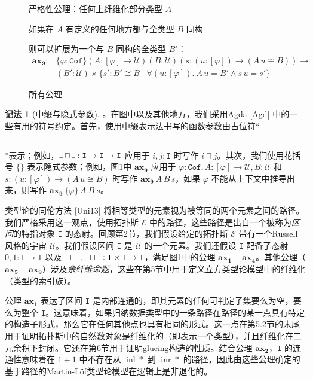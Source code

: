 \documentclass{ctexart}
\theoremstyle{plain}
\theoremstyle{definition}
\theoremstyle{definition}
\theoremstyle{definition}
\theoremstyle{definition}
\newtheorem{notation}[theorem]{记法}
\newcommand\ttI{\mathtt{I}}
\newcommand{\Cof}{\mathtt{Cof}}
\DeclareMathOperator\inl{inl}
\DeclareMathOperator\inr{inr}
\newcommand{\ax}[1]{\mathbf{ax_{#1}}}
\newcommand{\ul}{{\rule[0ex]{0.4em}{0.4pt}}} %
\numberwithin{equation}{section}
\begin{document}
\begin{figure}[htbp]
严格性公理：任何上纤维化部分类型 $A$

如果在 $A$ 有定义的任何地方都与全类型 $B$ 同构

则可以扩展为一个与 $B$ 同构的全类型 $B'$：
\begin{align*}
\ax{9} : &\{\varphi : \Cof\}(A : [\varphi] \to \mathcal{U})(B : \mathcal{U})(s : (u : [\varphi]) \to (A\,u \cong B)) \to \\
&(B' : \mathcal{U}) \times \{s' : B' \cong B \mid \forall(u : [\varphi]).\ A\,u = B' \land s\,u = s'\}
\end{align*}

\caption{所有公理}
\label{fig:all-axioms}

\end{figure}

\begin{notation}[中缀与隐式参数]。在图中以及其他地方，我们采用Agda [Agd] 中的一些有用的符号约定。首先，使用中缀表示法书写的函数参数由占位符“\ul”表示；例如，$\ul\sqcap\ul : \ttI \to \ttI \to \ttI$ 应用于 $i, j : \ttI$ 时写作 $i \sqcap j$。其次，我们使用花括号 $\{ \}$ 表示隐式参数；例如，图1中 $\ax{9}$ 应用于 $\varphi : \mathtt{Cof}, A : [\varphi] \to \mathcal{U}, B : \mathcal{U}$ 和 $s : (u : [\varphi]) \to (A\,u \cong B)$ 时写作 $\ax{9}\ A\,B\,s$，如果 $\varphi$ 不能从上下文中推导出来，则写作 $\ax{9}\ \{\varphi\}\,A\ B\ s$。
\end{notation}

类型论的同伦方法 [Uni13] 将相等类型的元素视为被等同的两个元素之间的路径。我们严格采用这一观点，使用拓扑斯 $\mathcal{E}$ 中的路径，这些路径是出自一个被称为\textit{区间}的特指对象 $\ttI$ 的态射。回顾第2节，我们假设给定的拓扑斯 $\mathcal{E}$ 带有一个Russell风格的宇宙 $\mathcal{U}$。我们假设区间 $\ttI$ 是 $\mathcal{U}$ 的一个元素。我们还假设 $\ttI$ 配备了态射 $0, 1 : 1 \to \ttI$ 以及 $\ul\sqcap\ul, \ul\sqcup\ul : \ttI \times \ttI \to \ttI$，满足图1中的公理 $\ax{1}-\ax{4}$。其他公理（$\ax{5}-\ax{9}$）涉及\textit{余纤维命题}，这些在第5节中用于定义立方类型论模型中的纤维化（类型的索引族）。

公理 $\ax{1}$ 表达了区间 $\ttI$ 是内部连通的，即其元素的任何可判定子集要么为空，要么为整个 $\ttI$。这意味着，如果归纳数据类型中的一条路径在路径的某一点具有特定的构造子形式，那么它在任何其他点也具有相同的形式。这一点在第5.2节的末尾用于证明拓扑斯中的自然数对象是纤维化的（即表示一个类型），并且纤维化在二元余积下封闭。它还在第6节用于证明glueing构造的性质。结合公理 $\ax{2}$，$\ttI$ 的连通性意味着在 $1+1$ 中不存在从 $\inl *$ 到 $\inr *$ 的路径，因此由这些公理确定的基于路径的Martin-L\"of类型论模型在逻辑上是非退化的。
\end{document}
